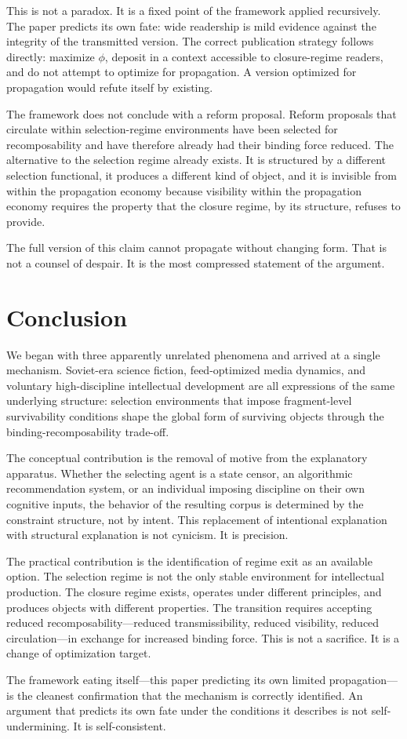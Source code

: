 \documentclass[12pt]{article}
\newcommand{\bind}{\phi}
\begin{document}
This is not a paradox. It is a fixed point of the framework applied
recursively. The paper predicts its own fate: wide readership is mild
evidence against the integrity of the transmitted version. The correct
publication strategy follows directly: maximize $\bind$, deposit in a
context accessible to closure-regime readers, and do not attempt to
optimize for propagation. A version optimized for propagation would
refute itself by existing.

The framework does not conclude with a reform proposal. Reform proposals
that circulate within selection-regime environments have been selected for
recomposability and have therefore already had their binding force reduced.
The alternative to the selection regime already exists. It is structured by
a different selection functional, it produces a different kind of object, and
it is invisible from within the propagation economy because visibility within
the propagation economy requires the property that the closure regime, by
its structure, refuses to provide.

The full version of this claim cannot propagate without changing form. That
is not a counsel of despair. It is the most compressed statement of the
argument.

\section{Conclusion}
\label{sec:conclusion}

We began with three apparently unrelated phenomena and arrived at a single
mechanism. Soviet-era science fiction, feed-optimized media dynamics, and
voluntary high-discipline intellectual development are all expressions of the
same underlying structure: selection environments that impose
fragment-level survivability conditions shape the global form of surviving
objects through the binding-recomposability trade-off.

The conceptual contribution is the removal of motive from the explanatory
apparatus. Whether the selecting agent is a state censor, an algorithmic
recommendation system, or an individual imposing discipline on their own
cognitive inputs, the behavior of the resulting corpus is determined by the
constraint structure, not by intent. This replacement of intentional
explanation with structural explanation is not cynicism. It is precision.

The practical contribution is the identification of regime exit as an
available option. The selection regime is not the only stable environment
for intellectual production. The closure regime exists, operates under
different principles, and produces objects with different properties. The
transition requires accepting reduced recomposability—reduced
transmissibility, reduced visibility, reduced circulation—in exchange for
increased binding force. This is not a sacrifice. It is a change of
optimization target.

The framework eating itself—this paper predicting its own limited
propagation—is the cleanest confirmation that the mechanism is correctly
identified. An argument that predicts its own fate under the conditions it
describes is not self-undermining. It is self-consistent.
\end{document}
